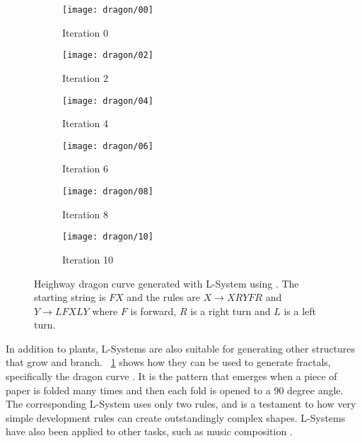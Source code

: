 \begin{figure}[!ht]
    \centering
    \begin{subfigure}{0.32\textwidth}
        \centering
        \texttt{[image: dragon/00]}
        \caption{Iteration 0}
    \end{subfigure}
    \begin{subfigure}{0.32\textwidth}
        \centering
        \texttt{[image: dragon/02]}
        \caption{Iteration 2}
    \end{subfigure}
    \begin{subfigure}{0.32\textwidth}
        \centering
        \texttt{[image: dragon/04]}
        \caption{Iteration 4}
    \end{subfigure}
    \par\bigskip
    \begin{subfigure}{0.32\textwidth}
        \centering
        \texttt{[image: dragon/06]}
        \caption{Iteration 6}
    \end{subfigure}
    \begin{subfigure}{0.32\textwidth}
        \centering
        \texttt{[image: dragon/08]}
        \caption{Iteration 8}
    \end{subfigure}
    \begin{subfigure}{0.32\textwidth}
        \centering
        \texttt{[image: dragon/10]}
        \caption{Iteration 10}
    \end{subfigure}
    \caption[Dragon curve]{
        Heighway dragon curve generated with L-System using \cite{lsystemgenerator}.
        The starting string is $FX$ and the rules are $X \rightarrow XRYFR$ and $Y \rightarrow LFXLY$ where $F$ is forward, $R$ is a right turn and $L$ is a left turn\footnotemark.
    }
    \label{fig:dragon-curve}
\end{figure}


In addition to plants, L-Systems are also suitable for generating other structures that grow and branch.
\figurename~\ref{fig:dragon-curve} shows how they can be used to generate fractals, specifically the dragon curve \cite{gardner1967heighway}.
It is the pattern that emerges when a piece of paper is folded many times and then each fold is opened to a 90 degree angle.
The corresponding L-System uses only two rules, and is a testament to how very simple development rules can create outstandingly complex shapes.
L-Systems have also been applied to other tasks, such as music composition \cite{manousakis2006musical}.

